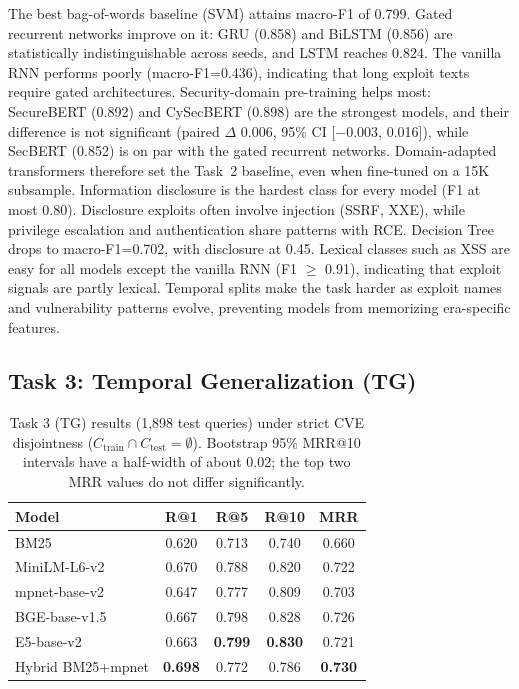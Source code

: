 \documentclass{article}
\begin{document}
The best bag-of-words baseline (SVM) attains macro-F1 of 0.799. Gated recurrent networks improve on it: GRU (0.858) and BiLSTM (0.856) are statistically indistinguishable across seeds, and LSTM reaches 0.824. The vanilla RNN performs poorly (macro-F1=0.436), indicating that long exploit texts require gated architectures. Security-domain pre-training helps most: SecureBERT (0.892) and CySecBERT (0.898) are the strongest models, and their difference is not significant (paired $\Delta$ 0.006, 95\% CI [$-$0.003, 0.016]), while SecBERT (0.852) is on par with the gated recurrent networks. Domain-adapted transformers therefore set the Task~2 baseline, even when fine-tuned on a 15K subsample. Information disclosure is the hardest class for every model (F1 at most 0.80). Disclosure exploits often involve injection (SSRF, XXE), while privilege escalation and authentication share patterns with RCE. Decision Tree drops to macro-F1=0.702, with disclosure at 0.45. Lexical classes such as XSS are easy for all models except the vanilla RNN (F1 $\geq$ 0.91), indicating that exploit signals are partly lexical. Temporal splits make the task harder as exploit names and vulnerability patterns evolve, preventing models from memorizing era-specific features.

\subsection{Task 3: Temporal Generalization (TG)}
\label{sec:task3}

\begin{table}
\vspace{-4pt}
\centering
\small
\setlength{\tabcolsep}{3pt}
\caption{Task 3 (TG) results (1,898 test queries) under strict CVE disjointness
($C_{\text{train}} \cap C_{\text{test}} = \emptyset$). Bootstrap 95\% MRR@10 intervals have a half-width of about 0.02; the top two MRR values do not differ significantly.}
\label{tab:task3-results}
\begin{tabular}{lcccc}
\toprule
\textbf{Model} & \textbf{R@1} & \textbf{R@5} & \textbf{R@10} & \textbf{MRR} \\
\midrule
BM25 & 0.620 & 0.713 & 0.740 & 0.660 \\
MiniLM-L6-v2 & 0.670 & 0.788 & 0.820 & 0.722 \\
mpnet-base-v2 & 0.647 & 0.777 & 0.809 & 0.703 \\
BGE-base-v1.5 & 0.667 & 0.798 & 0.828 & 0.726 \\
E5-base-v2 & 0.663 & \textbf{0.799} & \textbf{0.830} & 0.721 \\
\midrule
Hybrid BM25+mpnet & \textbf{0.698} & 0.772 & 0.786 & \textbf{0.730} \\
\bottomrule
\end{tabular}
\vspace{-4pt}
\end{table}
\end{document}
